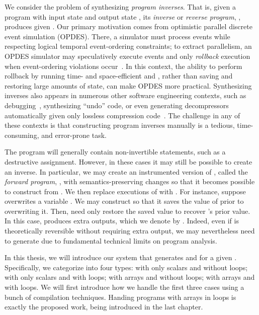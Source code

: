 \documentclass[12pt]{gatech-thesis}
\begin{document}
We consider the problem of synthesizing \emph{program inverses}.
That is, given a program \Program with input state \Input and output state \Output, its \emph{inverse} or \emph{reverse program}, \Inverse, produces \Input given \Output.
Our primary motivation comes from optimistic parallel discrete event simulation (OPDES).
There, a simulator must process events while respecting logical temporal event-ordering constraints;
to extract parallelism, an OPDES simulator may speculatively execute events and only \emph{rollback} execution when event-ordering violations occur~\cite{Jefferson1985}.
In this context, the ability to perform rollback by running time- and space-efficient \Program and \Inverse, rather than saving and restoring large amounts of state, can make OPDES more practical.
%
Synthesizing inverses also appears in numerous other software engineering contexts, such as debugging~\cite{Biswas1999}, synthesizing ``undo'' code, or even generating decompressors automatically given only lossless compression code~\cite{Srivastava2011}.
The challenge in any of these contexts is that constructing program inverses manually is a tedious, time-consuming, and error-prone task.

The program \Program will generally contain non-invertible statements, such as a destructive assignment.
However, in these cases it may still be possible to create an inverse.
In particular, we may create an instrumented version of \Program, called the \emph{forward program}, \Forward, with semantics-preserving changes so that it becomes possible to construct \Inverse from \Forward.
We then replace executions of \Program with \Forward.
For instance, suppose \Program overwrites a variable \Var.
We may construct \Forward so that it saves the value of \Var prior to overwriting it.
Then, \Inverse need only restore the saved value to recover \Var's prior value.
In this case, \Forward produces extra outputs, which we denote by \ExtraOuts.
Indeed, even if \Program is theoretically reversible without requiring extra output, we may nevertheless need to generate \ExtraOuts due to fundamental technical limits on program analysis.

In this thesis, we will introduce our system that generates \Forward and \Inverse for a given \Program. 
Specifically, we categorize \Program into four types: \Program with only scalars and without loops; \Program with only scalars and with loops; \Program with arrays and without loops; \Program with arrays and with loops.
We will first introduce how we handle the first three cases using a bunch of compilation techniques.
Handing programs with arrays in loops is exactly the proposed work, being introduced in the last chapter.
\end{document}
